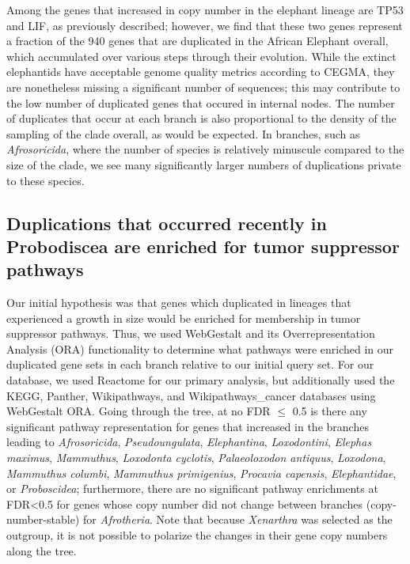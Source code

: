 \documentclass[]{elsarticle} %
\begin{document}
Among the genes that increased in copy number in the elephant lineage are TP53 and LIF, as previously described; however, we find that these two genes represent a fraction of the 940 genes that are duplicated in the African Elephant overall, which accumulated over various steps through their evolution. While the extinct elephantids have acceptable genome quality metrics according to CEGMA, they are nonetheless missing a significant number of sequences; this may contribute to the low number of duplicated genes that occured in internal nodes. The number of duplicates that occur at each branch is also proportional to the density of the sampling of the clade overall, as would be expected. In branches, such as \emph{Afrosoricida}, where the number of species is relatively minuscule compared to the size of the clade, we see many significantly larger numbers of duplications private to these species.

\hypertarget{duplications-that-occurred-recently-in-probodiscea-are-enriched-for-tumor-suppressor-pathways}{%
\subsection{Duplications that occurred recently in Probodiscea are enriched for tumor suppressor pathways}\label{duplications-that-occurred-recently-in-probodiscea-are-enriched-for-tumor-suppressor-pathways}}

Our initial hypothesis was that genes which duplicated in lineages that experienced a growth in size would be enriched for membership in tumor suppressor pathways. Thus, we used WebGestalt and its Overrepresentation Analysis (ORA) functionality to determine what pathways were enriched in our duplicated gene sets in each branch relative to our initial query set. For our database, we used Reactome for our primary analysis, but additionally used the KEGG, Panther, Wikipathways, and Wikipathways\_cancer databases using WebGestalt ORA. Going through the tree, at no FDR \(\leq\) 0.5 is there any significant pathway representation for genes that increased in the branches leading to \emph{Afrosoricida}, \emph{Pseudoungulata}, \emph{Elephantina}, \emph{Loxodontini}, \emph{Elephas maximus}, \emph{Mammuthus}, \emph{Loxodonta cyclotis}, \emph{Palaeoloxodon antiquus}, \emph{Loxodona}, \emph{Mammuthus columbi}, \emph{Mammuthus primigenius}, \emph{Procavia capensis}, \emph{Elephantidae}, or \emph{Proboscidea}; furthermore, there are no significant pathway enrichments at FDR\textless{}0.5 for genes whose copy number did not change between branches (copy-number-stable) for \emph{Afrotheria}. Note that because \emph{Xenarthra} was selected as the outgroup, it is not possible to polarize the changes in their gene copy numbers along the tree.
\end{document}
